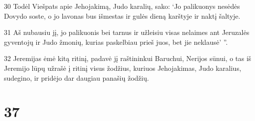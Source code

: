 \par 30 Todėl Viešpats apie Jehojakimą, Judo karalių, sako: ‘Jo palikuonys nesėdės Dovydo soste, o jo lavonas bus išmestas ir gulės dieną karštyje ir naktį šaltyje. 
\par 31 Aš nubausiu jį, jo palikuonis bei tarnus ir užleisiu visas nelaimes ant Jeruzalės gyventojų ir Judo žmonių, kurias paskelbiau prieš juos, bet jie neklausė’ ”. 
\par 32 Jeremijas ėmė kitą ritinį, padavė jį raštininkui Baruchui, Nerijos sūnui, o tas iš Jeremijo lūpų užrašė į ritinį visus žodžius, kuriuos Jehojakimas, Judo karalius, sudegino, ir pridėjo dar daugiau panašių žodžių.



\chapter{37}


